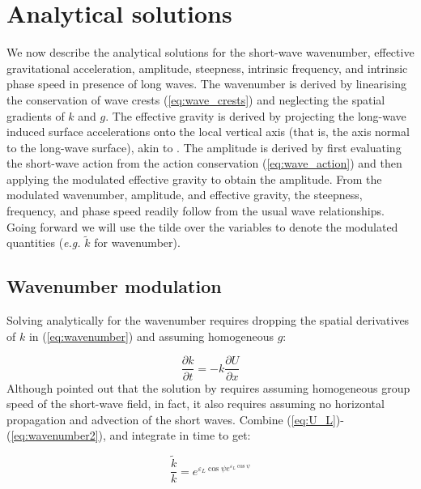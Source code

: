 \documentclass[lineno]{jfm}
\begin{document}
\section{Analytical solutions}
\label{section:analytical_solutions}

We now describe the analytical solutions for the short-wave wavenumber,
effective gravitational acceleration, amplitude, steepness, intrinsic frequency,
and intrinsic phase speed in presence of long waves.
The wavenumber is derived by linearising the conservation of wave crests
(\ref{eq:wave_crests}) and neglecting the spatial gradients of $k$ and $g$.
The effective gravity is derived by projecting the long-wave induced surface
accelerations onto the local vertical axis (that is, the axis normal to the
long-wave surface), akin to \citet{zhang1990evolution}.
The amplitude is derived by first evaluating the short-wave action from the
action conservation (\ref{eq:wave_action}) and then applying the modulated
effective gravity to obtain the amplitude.
From the modulated wavenumber, amplitude, and effective gravity, the steepness,
frequency, and phase speed readily follow from the usual wave relationships.
Going forward we will use the tilde over the variables to denote the modulated
quantities (\textit{e.g.} $\widetilde{k}$ for wavenumber).

\subsection{Wavenumber modulation}
\label{subsection:wavenumber_modulation}

Solving analytically for the wavenumber requires dropping the spatial derivatives
of $k$ in (\ref{eq:wavenumber}) and assuming homogeneous $g$:

\begin{equation}
\label{eq:wavenumber2}
\dfrac{\partial k}{\partial t}
= - k \dfrac{\partial U}{\partial x}
\end{equation}
Although \citet{peureux2021unsteady} pointed out that the solution by
\citet{longuet1960changes} requires assuming homogeneous group speed of the
short-wave field, in fact, it also requires assuming no horizontal propagation
and advection of the short waves.
Combine (\ref{eq:U_L})-(\ref{eq:wavenumber2}), and integrate in time to get:

\begin{equation}
\label{eq:k_short_exact}
\frac{\widetilde{k}}{k} = e^{\varepsilon_L \cos{\psi} e^{\varepsilon_L \cos{\psi}}}
\end{equation}
\end{document}
